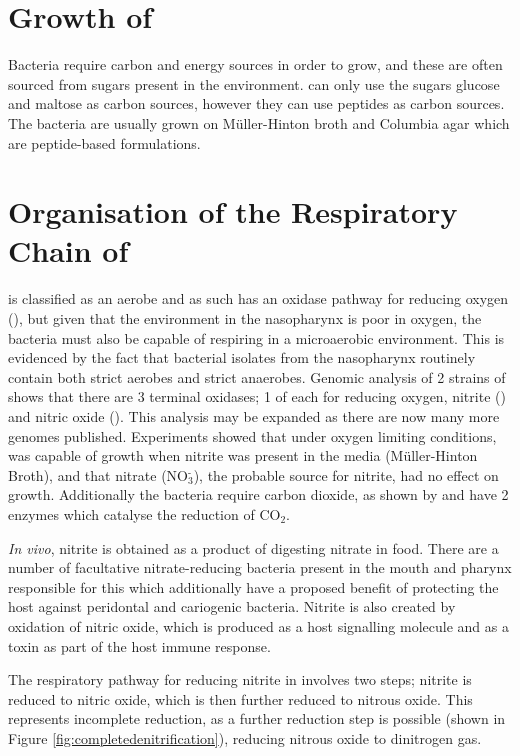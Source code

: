 \section{Growth of \Nm{}}
Bacteria require carbon and energy sources in order to grow, and these are often sourced from sugars present in the environment. \Nm{} can only use the sugars glucose and maltose as carbon sources\cite{Exley2005,Beno1968}, however they can use peptides as carbon sources. The bacteria are usually grown on M\"uller-Hinton broth and Columbia agar which are peptide-based formulations.

\section{Organisation of the Respiratory Chain of \Nm{}}
\Nm{} is classified as an aerobe and as such has an oxidase pathway for reducing oxygen (\cOxygen{}), but given that the environment in the nasopharynx is poor in oxygen, the bacteria must also be capable of respiring in a microaerobic environment. This is evidenced by the fact that bacterial isolates from the nasopharynx routinely contain both strict aerobes and strict anaerobes\cite{Rock2005}. Genomic analysis of 2 strains of \Nm{} shows that there are 3 terminal oxidases; 1 of each for reducing oxygen, nitrite (\cNitrite{}) and nitric oxide (\cNO{})\cite{Rock2005a}. This analysis may be expanded as there are now many more genomes published. Experiments showed that under oxygen limiting conditions, \Nm{} was capable of growth when nitrite was present in the media (M\"uller-Hinton Broth), and that nitrate (NO$_{\textrm{3}}^{\textrm{-}}$), the probable source for nitrite, had no effect on growth\cite{Rock2005a}. Additionally the bacteria require carbon dioxide, as shown by \citet{Tuttle1952} and have 2 enzymes which catalyse the reduction of CO$_{\textrm{2}}$\cite{DeVoe1982}.

\textit{In vivo}, nitrite is obtained as a product of digesting nitrate in food. There are a number of facultative nitrate-reducing bacteria present in the mouth and pharynx responsible for this\cite{Rock2005} which additionally have a proposed benefit of protecting the host against peridontal and cariogenic bacteria\cite{Lundberg2004}. Nitrite is also created by oxidation of nitric oxide, which is produced as a host signalling molecule and as a toxin as part of the host immune response\cite{Lundberg2004,Rock2005}.

The respiratory pathway for reducing nitrite in \Nm{} involves two steps; nitrite is reduced to nitric oxide, which is then further reduced to nitrous oxide. This represents incomplete reduction, as a further reduction step is possible (shown in Figure \ref{fig:completedenitrification}), reducing nitrous oxide to dinitrogen gas\cite{Rock2005,Deeudom2006}.

